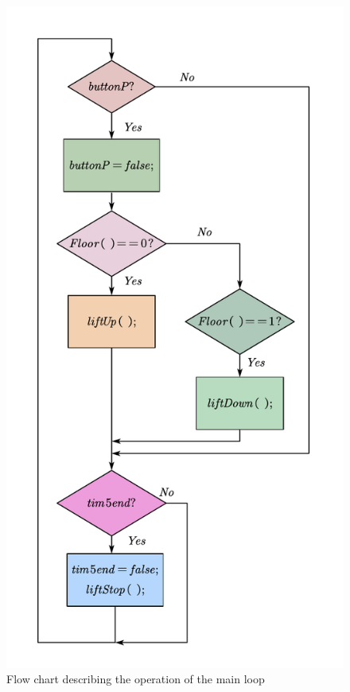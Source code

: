 \begin{figure}[H]
    \centering
    \includegraphics[scale=0.5]{Graphics/AXGLYPH_PDF/FLOWCHART.pdf}
    \caption{Flow chart describing the operation of the main loop}
    \label{fig:while_loop}
\end{figure}

